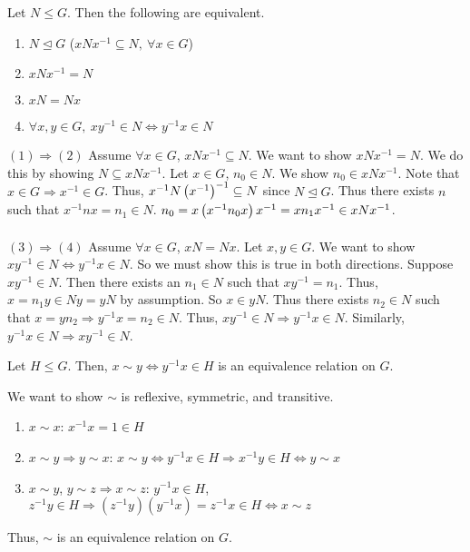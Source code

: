 \documentclass{mathnotes}
\begin{document}
\begin{bthm}
  Let $N\le G$. Then the following are equivalent.
  \begin{enumerate}
    \item $N\unlhd G$ ($xNx^{-1}\subseteq N,\ \forall x\in G$)
    \item $xNx^{-1}=N$
    \item $xN=Nx$
    \item $\forall x,y\in G,\ xy^{-1}\in N\Leftrightarrow y^{-1}x\in N$
  \end{enumerate}
\end{bthm}

\begin{bpf}
  $(1)\Rightarrow(2)$ Assume $\forall x\in G$, $xNx^{-1}\subseteq N$. We want
  to show $xNx^{-1}=N$. We do this by showing $N\subseteq xNx^{-1}$. Let $x\in
  G$, $n_0\in N$. We show $n_0\in xNx^{-1}$. Note that $x\in G\Rightarrow
  x^{-1}\in G$. Thus, $x^{-1}N\left( x^{-1} \right)^{-1}\subseteq N$ since $N\unlhd G$.
  Thus there exists $n$ such that $x^{-1}nx=n_1\in N$.
  $n_0=x\left( x^{-1}n_0x \right)x^{-1}=xn_1x^{-1}\in xNx^{-1}$.\\\\
  $(3)\Rightarrow(4)$ Assume $\forall x\in G$, $xN=Nx$. Let $x,y\in G$. We want
  to show $xy^{-1}\in N\Leftrightarrow y^{-1}x\in N$. So we must show this is
  true in both directions. Suppose $xy^{-1}\in N$. Then there exists an $n_1\in
  N$ such that $xy^{-1}=n_1$. Thus, $x=n_1y\in Ny=yN$ by assumption. So $x\in
  yN$. Thus there exists $n_2\in N$ such that $x=yn_2\Rightarrow y^{-1}x=n_2\in
  N$. Thus, $xy^{-1}\in N\Rightarrow y^{-1}x\in N$. Similarly, $y^{-1}x\in
  N\Rightarrow xy^{-1}\in N$.
\end{bpf}

\begin{prop}
  Let $H\le G$. Then, $x\sim y\Leftrightarrow y^{-1}x\in H$ is an equivalence
  relation on $G$.
\end{prop}

\begin{pf}
  We want to show $\sim$ is reflexive, symmetric, and transitive.
  \begin{enumerate}
    \item $x\sim x$: $x^{-1}x=1\in H$
    \item $x\sim y\Rightarrow y\sim x$: $x\sim y\Leftrightarrow y^{-1}x\in
      H\Rightarrow x^{-1}y\in H\Leftrightarrow y\sim x$
    \item $x\sim y$, $y\sim z\Rightarrow x\sim z$: $y^{-1}x\in H$, $z^{-1}y\in
      H\Rightarrow(z^{-1}y)(y^{-1}x)=z^{-1}x\in H\Leftrightarrow x\sim z$
  \end{enumerate}
  Thus, $\sim$ is an equivalence relation on $G$.
\end{pf}
\end{document}
